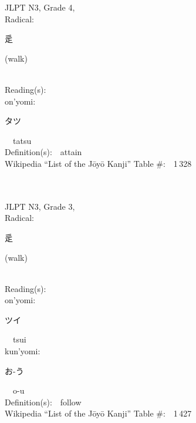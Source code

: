 \begin{multicols}{2}
{JLPT N3, Grade 4, \\Radical:\ \ {\begin{CJK}{UTF8}{min} 辵 \end{CJK}} (walk) } \\
Reading(s):\ \ \\
{\hspace*{1em}}on'yomi:\ \ \\
{\hspace*{2em}}{\begin{CJK}{UTF8}{min} タツ \end{CJK}}\ \ tatsu\ \ \\
Definition(s):\ \ attain \\
Wikipedia ``List of the J\=oy\=o Kanji'' Table \#:\ \ 1\,328 \\
\ \ \\
{\fontsize{34pt}{40pt}  }\ \ \\  %
{JLPT N3, Grade 3, \\Radical:\ \ {\begin{CJK}{UTF8}{min} 辵 \end{CJK}} (walk) } \\
Reading(s):\ \ \\
{\hspace*{1em}}on'yomi:\ \ \\
{\hspace*{2em}}{\begin{CJK}{UTF8}{min} ツイ \end{CJK}}\ \ tsui\ \ \\
{\hspace*{1em}}kun'yomi:\ \ \\
{\hspace*{2em}}{\begin{CJK}{UTF8}{min} お-う \end{CJK}}\ \ o-u\ \ \\
Definition(s):\ \ follow \\
Wikipedia ``List of the J\=oy\=o Kanji'' Table \#:\ \ 1\,427 \\
\ \ \\
{\fontsize{34pt}{40pt}  }\ \ \\  %

\end{multicols}
